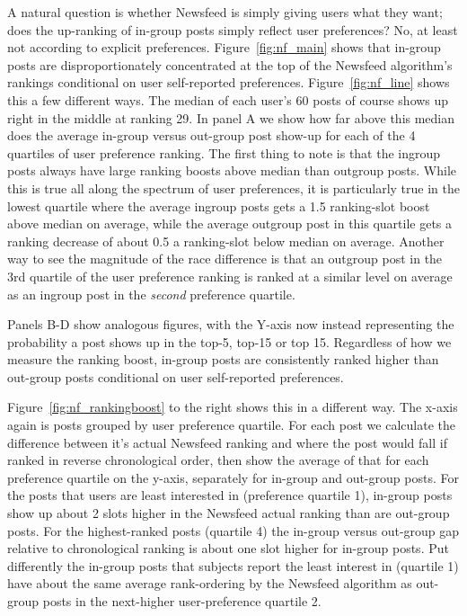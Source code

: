 \documentclass[12pt,letterpaper]{article}
\begin{document}
A natural question is whether Newsfeed is simply giving users what they want; does the up-ranking of in-group posts simply reflect user preferences? No, at least not according to explicit preferences. Figure~\ref{fig:nf_main} shows that in-group posts are disproportionately concentrated at the top of the Newsfeed algorithm's rankings conditional on user self-reported preferences. Figure~\ref{fig:nf_line} shows this a few different ways. The median of each user's 60 posts of course shows up right in the middle at ranking 29. In panel A we show how far above this median does the average in-group versus out-group post show-up for each of the 4 quartiles of user preference ranking. The first thing to note is that the ingroup posts always have large ranking boosts above median than outgroup posts. While this is true all along the spectrum of user preferences, it is particularly true in the lowest quartile where the average ingroup posts gets a 1.5  ranking-slot boost above median on average, while the average outgroup post in this quartile gets a ranking decrease of about 0.5 a ranking-slot below median on average. Another way to see the magnitude of the race difference is that an outgroup post in the 3rd quartile of the user preference ranking is ranked at a similar level on average as an ingroup post in the \textit{second} preference quartile. 

Panels B-D show analogous figures, with the Y-axis now instead representing the probability a post shows up in the top-5, top-15 or top 15. Regardless of how we measure the ranking boost, in-group posts are consistently ranked higher than out-group posts conditional on user self-reported preferences.

Figure~\ref{fig:nf_rankingboost} to the right shows this in a different way. The x-axis again is posts grouped by user preference quartile. For each post we calculate the difference between it's actual Newsfeed ranking and where the post would fall if ranked in reverse chronological order, then show the average of that for each preference quartile on the y-axis, separately for in-group and out-group posts. For the posts that users are least interested in (preference quartile 1), in-group posts show up about 2 slots higher in the Newsfeed actual ranking than are out-group posts. For the highest-ranked posts (quartile 4) the in-group versus out-group gap relative to chronological ranking is about one slot higher for in-group posts. Put differently the in-group posts that subjects report the least interest in (quartile 1) have about the same average rank-ordering by the Newsfeed algorithm as out-group posts in the next-higher user-preference quartile 2.
\end{document}
